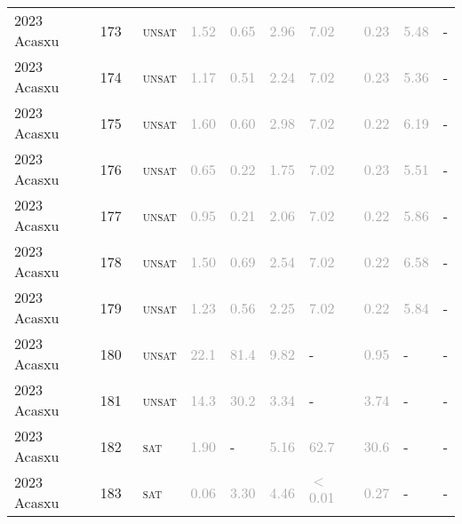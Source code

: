 \begin{center}
{\begin{longtable}{@{}llllllllll@{}}
2023 Acasxu & 173 & ~\textsc{unsat} & \textcolor{darkgray}{1.52} & \textcolor{darkgray}{0.65} & \textcolor{darkgray}{2.96} & \textcolor{darkgray}{7.02} & \textcolor{darkgray}{0.23} & \textcolor{darkgray}{5.48} & - \\
2023 Acasxu & 174 & ~\textsc{unsat} & \textcolor{darkgray}{1.17} & \textcolor{darkgray}{0.51} & \textcolor{darkgray}{2.24} & \textcolor{darkgray}{7.02} & \textcolor{darkgray}{0.23} & \textcolor{darkgray}{5.36} & - \\
2023 Acasxu & 175 & ~\textsc{unsat} & \textcolor{darkgray}{1.60} & \textcolor{darkgray}{0.60} & \textcolor{darkgray}{2.98} & \textcolor{darkgray}{7.02} & \textcolor{darkgray}{0.22} & \textcolor{darkgray}{6.19} & - \\
2023 Acasxu & 176 & ~\textsc{unsat} & \textcolor{darkgray}{0.65} & \textcolor{darkgray}{0.22} & \textcolor{darkgray}{1.75} & \textcolor{darkgray}{7.02} & \textcolor{darkgray}{0.23} & \textcolor{darkgray}{5.51} & - \\
2023 Acasxu & 177 & ~\textsc{unsat} & \textcolor{darkgray}{0.95} & \textcolor{darkgray}{0.21} & \textcolor{darkgray}{2.06} & \textcolor{darkgray}{7.02} & \textcolor{darkgray}{0.22} & \textcolor{darkgray}{5.86} & - \\
2023 Acasxu & 178 & ~\textsc{unsat} & \textcolor{darkgray}{1.50} & \textcolor{darkgray}{0.69} & \textcolor{darkgray}{2.54} & \textcolor{darkgray}{7.02} & \textcolor{darkgray}{0.22} & \textcolor{darkgray}{6.58} & - \\
2023 Acasxu & 179 & ~\textsc{unsat} & \textcolor{darkgray}{1.23} & \textcolor{darkgray}{0.56} & \textcolor{darkgray}{2.25} & \textcolor{darkgray}{7.02} & \textcolor{darkgray}{0.22} & \textcolor{darkgray}{5.84} & - \\
2023 Acasxu & 180 & ~\textsc{unsat} & \textcolor{darkgray}{22.1} & \textcolor{darkgray}{81.4} & \textcolor{darkgray}{9.82} & - & \textcolor{darkgray}{0.95} & - & - \\
2023 Acasxu & 181 & ~\textsc{unsat} & \textcolor{darkgray}{14.3} & \textcolor{darkgray}{30.2} & \textcolor{darkgray}{3.34} & - & \textcolor{darkgray}{3.74} & - & - \\
2023 Acasxu & 182 & ~\textsc{sat} & \textcolor{darkgray}{1.90} & - & \textcolor{darkgray}{5.16} & \textcolor{darkgray}{62.7} & \textcolor{darkgray}{30.6} & - & - \\
2023 Acasxu & 183 & ~\textsc{sat} & \textcolor{darkgray}{0.06} & \textcolor{darkgray}{3.30} & \textcolor{darkgray}{4.46} & \textcolor{darkgray}{$<$0.01} & \textcolor{darkgray}{0.27} & - & - \\

\end{longtable}}
\end{center}

